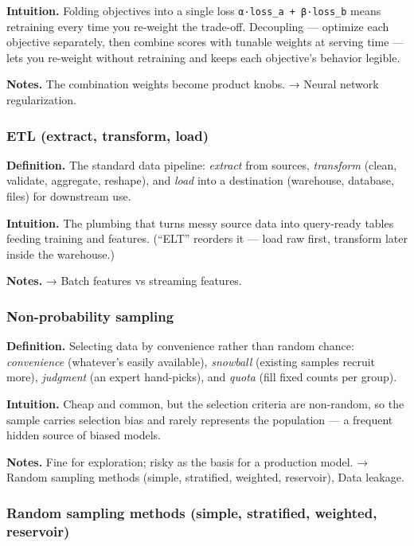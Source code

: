 \documentclass[
  10pt,
  letterpaper,
  onecolumn]{article}
\begin{document}
\textbf{Intuition.} Folding objectives into a single loss
\texttt{α·loss\_a\ +\ β·loss\_b} means retraining every time you
re-weight the trade-off. Decoupling --- optimize each objective
separately, then combine scores with tunable weights at serving time ---
lets you re-weight without retraining and keeps each objective's
behavior legible.

\textbf{Notes.} The combination weights become product knobs. → Neural
network regularization.

\hypertarget{etl-extract-transform-load}{%
\subsubsection{ETL (extract, transform,
load)}\label{etl-extract-transform-load}}

\textbf{Definition.} The standard data pipeline: \emph{extract} from
sources, \emph{transform} (clean, validate, aggregate, reshape), and
\emph{load} into a destination (warehouse, database, files) for
downstream use.

\textbf{Intuition.} The plumbing that turns messy source data into
query-ready tables feeding training and features. (``ELT'' reorders it
--- load raw first, transform later inside the warehouse.)

\textbf{Notes.} → Batch features vs streaming features.

\hypertarget{non-probability-sampling}{%
\subsubsection{Non-probability
sampling}\label{non-probability-sampling}}

\textbf{Definition.} Selecting data by convenience rather than random
chance: \emph{convenience} (whatever's easily available),
\emph{snowball} (existing samples recruit more), \emph{judgment} (an
expert hand-picks), and \emph{quota} (fill fixed counts per group).

\textbf{Intuition.} Cheap and common, but the selection criteria are
non-random, so the sample carries selection bias and rarely represents
the population --- a frequent hidden source of biased models.

\textbf{Notes.} Fine for exploration; risky as the basis for a
production model. → Random sampling methods (simple, stratified,
weighted, reservoir), Data leakage.

\hypertarget{random-sampling-methods-simple-stratified-weighted-reservoir}{%
\subsubsection{Random sampling methods (simple, stratified, weighted,
reservoir)}\label{random-sampling-methods-simple-stratified-weighted-reservoir}}
\end{document}
